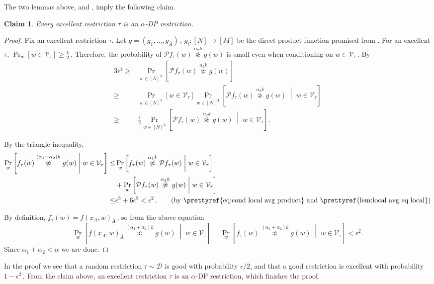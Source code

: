 \documentclass[11pt]{article}
\numberwithin{equation}{section}
\newtheorem{claim}[theorem]{Claim}
\theoremstyle{definition}
\theoremstyle{plain}
\newcommand{\Prob}[2][]{\Pr_{{#1}}\left[#2\right]} %
\newcommand{\given}{\;\middle\vert\;} %
\newcommand\f{f} %
\newcommand{\g}{g} %
\newcommand\bh{\mathcal{P}\f_\tau} %
\newcommand\neqg[1]{\stackrel{{#1}}{ \not\approx}} %
\newcommand\cons{\mathcal{V}} %
\newcommand\rest[1]{{\bar{#1}}}  %
\begin{document}
%
The two lemmas above,  and , imply the following claim.
\begin{claim}
	Every excellent restriction $\tau$ is an $\alpha$-DP restriction. %
\end{claim} %
%
%
%
\begin{proof}
Fix an excellent restriction $\tau$. %
Let $\g = (\g_1,\ldots, \g_{\rest{A}})$\,, $\g_i:[N]\rightarrow[M]$ be the direct product function promised from .
	For an excellent $\tau$, $\Prob[w]{w\in\cons_\tau }\geq\frac{\epsilon}{2}$\,. Therefore, the probability of $\bh(w)\neqg{\alpha_2 k}\g(w)$ is small even when conditioning on $w\in\cons_{\tau}$\,. By 
	\begin{align}\label{eq:cond local avg product}
	3\epsilon^{4} \geq& \Prob[{w\in [N]^{\rest{A}}}]{\bh(w)\neqg{\alpha_2 k}\g(w) }  \nonumber \\
	\geq&  \Prob[{w\in [N]^{\rest{A}}}]{ w\in\cons_\tau } \Prob[{w\in [N]^{\rest{A}}}]{\bh(w)\neqg{\alpha_2 k}\g(w) \given w\in\cons_\tau }  \nonumber\\
	\geq& \frac{\epsilon}{2}\Prob[{w\in [N]^{\rest{A}}}]{\bh(w)\neqg{\alpha_2 k}\g(w) \given w\in\cons_\tau }.
	\end{align}

	By the triangle inequality,
	\begin{align*}
	\Prob[w]{f_\tau(w)\neqg{(\alpha_1 +\alpha_2)  k}\g(w)\given w\in\cons_{\tau}}\leq&
	\Prob[w]{f_\tau(w) \neqg{\alpha_1 k} \bh(w)\given w\in\cons_{\tau}}\\
	 &+  \Prob[w]{\bh(w)\neqg{\alpha_2 k}\g(w)\given w\in\cons_{\tau}} \\
	\leq& \epsilon^3 + 6\epsilon^3 < \epsilon^2 \,. %
	\tag{\text{by \prettyref{eq:cond local avg product} and \prettyref{lem:local avg eq local}}} %
	\end{align*}
	
	
	By definition, $f_\tau(w) = \f(x_A,w)_\rest{A}$\,, so from the above equation
	\[ \Prob[w]{\f(x_A,w)_{\rest{A}}\neqg{(\alpha_1+\alpha_2) k}\g(w)\given w\in\cons_{\tau}} =  \Prob[w]{f_\tau(w)\neqg{(\alpha_1+\alpha_2) k}\g(w)\given w\in\cons_{\tau}} < \epsilon^2. \]
	Since $\alpha_1+\alpha_2 < \alpha$ we are done.
\end{proof} %
In the proof we see that a random restriction $\tau\sim\mathcal{D}$ is good with probability $\epsilon/2$, and that a good restriction is excellent with probability $1-\epsilon^2$\,. From the claim above, an excellent restriction $\tau$ is an $\alpha$-DP restriction, which finishes the proof. %
\end{document}
